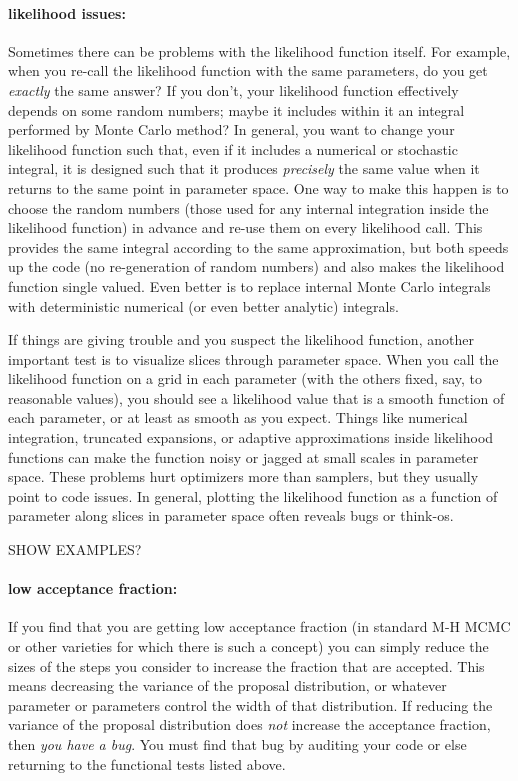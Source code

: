 \documentclass[12pt,twoside,pdftex]{article}
\begin{document}
\paragraph{likelihood issues:}
Sometimes there can be problems with the likelihood function itself.
For example,
  when you re-call the likelihood function with the same parameters,
  do you get \emph{exactly} the same answer?
If you don't, your likelihood function effectively depends on some random numbers;
  maybe it includes within it an integral performed by Monte Carlo method?
In general, you want to change your likelihood function such that,
  even if it includes a numerical or stochastic integral,
  it is designed such that it produces \emph{precisely} the same
  value when it returns to the same point in parameter space.
One way to make this happen is to choose the random numbers
  (those used for any internal integration inside the likelihood function)
  in advance and re-use them on every likelihood call.
This provides the same integral according to the same approximation,
  but both speeds up the code (no re-generation of random numbers)
  and also makes the likelihood function single valued.
Even better is to replace internal Monte Carlo integrals with
  deterministic numerical (or even better analytic) integrals.

If things are giving trouble and you suspect the likelihood function,
  another important test is to visualize slices through parameter space.
When you call the likelihood function on a grid in each parameter
  (with the others fixed, say, to reasonable values),
  you should see a likelihood value that is a smooth function of each parameter,
  or at least as smooth as you expect.
Things like numerical integration,
  truncated expansions,
  or adaptive approximations
  inside likelihood functions
  can make the function noisy or jagged at small scales in parameter space.
These problems hurt optimizers more than samplers,
  but they usually point to code issues.
In general, plotting the likelihood function as a function of parameter along
  slices in parameter space often reveals bugs or think-os.

SHOW EXAMPLES?

\paragraph{low acceptance fraction:}
If you find that you are getting low acceptance fraction
  (in standard M-H MCMC or other varieties for which there is such a concept)
  you can simply reduce the sizes of the steps you consider to increase the fraction that are accepted.
This means decreasing the variance of the proposal distribution,
  or whatever parameter or parameters control the width of that distribution.
If reducing the variance of the proposal distribution does \emph{not} increase the acceptance fraction,
  then \emph{you have a bug}.
You must find that bug by auditing your code or else returning to the functional tests listed above.
\end{document}
